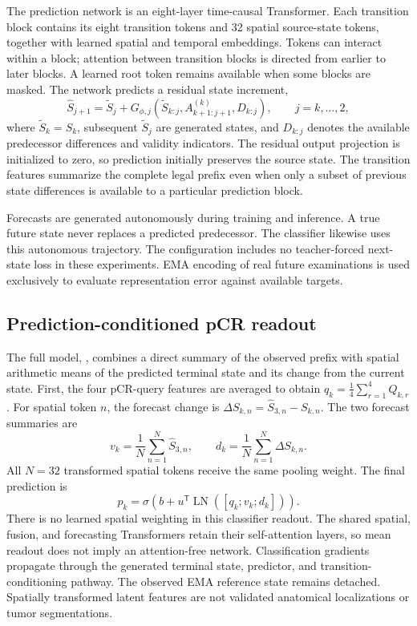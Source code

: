 The prediction network is an eight-layer time-causal Transformer. Each transition block contains its eight transition tokens and 32 spatial source-state tokens, together with learned spatial and temporal embeddings. Tokens can interact within a block; attention between transition blocks is directed from earlier to later blocks. A learned root token remains available when some blocks are masked. The network predicts a residual state increment,
\begin{equation}
 \widehat S_{j+1}=\widetilde S_j+
 G_{\phi,j}\!\left(\widetilde S_{k:j},A_{k+1:j+1}^{(k)},D_{k:j}\right),
 \qquad j=k,\ldots,2,
\end{equation}
where $\widetilde S_k=S_k$, subsequent $\widetilde S_j$ are generated states, and $D_{k:j}$ denotes the available predecessor differences and validity indicators. The residual output projection is initialized to zero, so prediction initially preserves the source state. The transition features summarize the complete legal prefix even when only a subset of previous state differences is available to a particular prediction block.

Forecasts are generated autonomously during training and inference. A true future state never replaces a predicted predecessor. The classifier likewise uses this autonomous trajectory. The configuration includes no teacher-forced next-state loss in these experiments. EMA encoding of real future examinations is used exclusively to evaluate representation error against available targets.

\subsection{Prediction-conditioned pCR readout}
\label{sec:readout}
The full model, \fullmodel{}, combines a direct summary of the observed prefix with spatial arithmetic means of the predicted terminal state and its change from the current state. First, the four pCR-query features are averaged to obtain $q_k=\frac14\sum_{r=1}^{4}Q_{k,r}$. For spatial token $n$, the forecast change is $\Delta S_{k,n}=\widehat S_{3,n}-S_{k,n}$. The two forecast summaries are
\begin{equation}
 v_k=\frac{1}{N}\sum_{n=1}^{N}\widehat S_{3,n},
 \qquad
 d_k=\frac{1}{N}\sum_{n=1}^{N}\Delta S_{k,n}.
\end{equation}
All $N=32$ transformed spatial tokens receive the same pooling weight. The final prediction is
\begin{equation}
 p_k=\sigma\!\left(b+u^{\mathsf T}
 \operatorname{LN}\!\left([q_k;v_k;d_k]\right)\right).
\end{equation}
There is no learned spatial weighting in this classifier readout. The shared spatial, fusion, and forecasting Transformers retain their self-attention layers, so mean readout does not imply an attention-free network. Classification gradients propagate through the generated terminal state, predictor, and transition-conditioning pathway. The observed EMA reference state remains detached. Spatially transformed latent features are not validated anatomical localizations or tumor segmentations.


